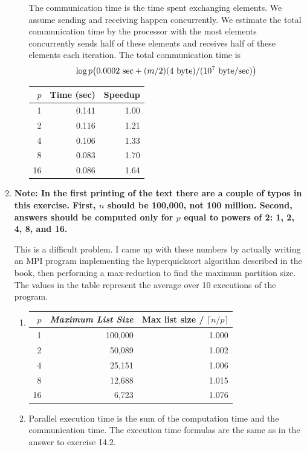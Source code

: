 \begin{enumerate}
\begin{enumerate}
      The communication time is the time spent exchanging elements.
      We assume sending and receiving happen concurrently.
      We estimate the total communication time by the processor with the
      most elements concurrently sends half of these elements and receives
      half of these elements each iteration.
      The total communication time is
      $$\log p\bigl(0.0002 {\rm\ sec} + (m/2)(4 {\rm\ byte})/(10^7 {\rm\ byte/sec})\bigr)$$

\begin{tabular}{|r|r|r|}
\hline
$p$ & Time (sec) & Speedup \\
\hline
1 &  0.141 & 1.00 \\
2 &  0.116 & 1.21 \\
4 &  0.106 & 1.33 \\
8 &  0.083 & 1.70 \\
16 & 0.086 & 1.64 \\
\hline
\end{tabular}
\end{enumerate}

\item {\bf Note: In the first printing of the text there are a couple of typos
      in this exercise. First, $n$ should be 100,000, not 100 million.
      Second, answers should be computed only for $p$ equal to powers of 2:
      1, 2, 4, 8, and 16.}

      This is a difficult problem. I came up with these numbers by actually
      writing an MPI program implementing the hyperquicksort
      algorithm described in the book, then performing a max-reduction to
      find the maximum partition size. The values in the table represent the
      average over 10 executions of the program.

\begin{enumerate}
\item

\begin{tabular}{|r|r|r|}
\hline
$p$ & {\it Maximum List Size} & Max list size / $\lceil n/p\rceil$ \\
\hline
1  & 100,000 & 1.000 \\
2  &  50,089 & 1.002 \\
4  &  25,151 & 1.006 \\
8  &  12,688 & 1.015 \\
16 &   6,723 & 1.076 \\
\hline
\end{tabular}

\item Parallel execution time is the sum of the computation time and the
      communication time. The execution time formulas are the same as in
      the answer to exercise 14.2. 


\end{enumerate}
\end{enumerate}
